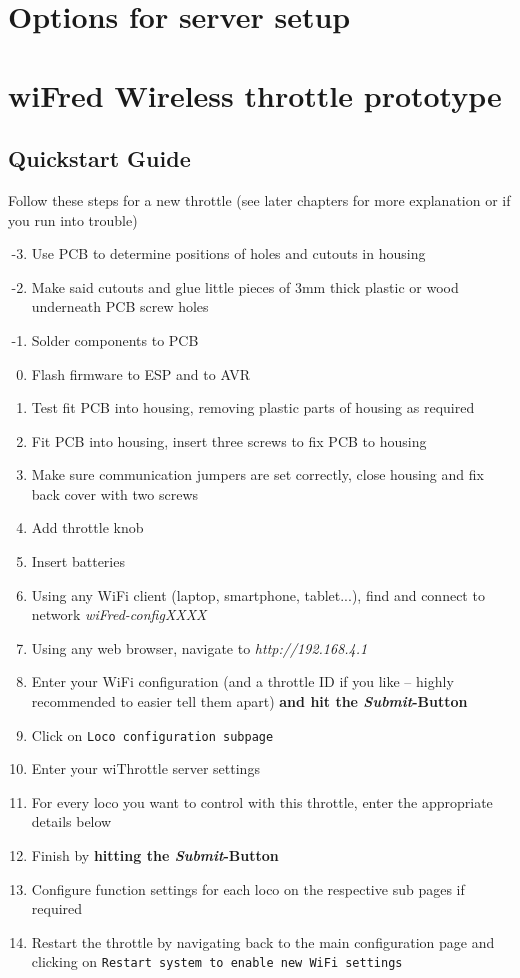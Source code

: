 \documentclass[11pt,a4paper]{scrartcl}
\begin{document}
\clearpage

\section{Options for server setup}

\clearpage

\section{wiFred Wireless throttle prototype} \label{oldThrottle}

\subsection{Quickstart Guide}

Follow these steps for a new throttle (see later chapters for more explanation or if you run into trouble)

\begin{enumerate}
\setcounter{enumi}{-4}
\item Use PCB to determine positions of holes and cutouts in housing
\item Make said cutouts and glue little pieces of 3mm thick plastic or wood underneath PCB screw holes  
\item Solder components to PCB
\item Flash firmware to ESP and to AVR
\item Test fit PCB into housing, removing plastic parts of housing as required
\item Fit PCB into housing, insert three screws to fix PCB to housing
\item Make sure communication jumpers are set correctly, close housing and fix back cover with two screws
\item Add throttle knob
\item Insert batteries
\item Using any WiFi client (laptop, smartphone, tablet...), find and connect to network \textit{wiFred-configXXXX}
\item Using any web browser, navigate to \textit{http://192.168.4.1}
\item Enter your WiFi configuration (and a throttle ID if you like -- highly recommended to easier tell them apart) \textbf{and hit the \textit{Submit}-Button}
\item Click on \texttt{Loco configuration subpage}
\item Enter your wiThrottle server settings
\item For every loco you want to control with this throttle, enter the appropriate details below
\item Finish by \textbf{hitting the \textit{Submit}-Button}
\item Configure function settings for each loco on the respective sub pages if required
\item Restart the throttle by navigating back to the main configuration page and clicking on \texttt{Restart system to enable new WiFi settings}
\end{enumerate}
\end{document}
